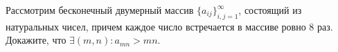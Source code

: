 \documentclass{article}
\begin{document}
Рассмотрим бесконечный двумерный массив $\{a_{ij}\}_{i,j=1}^{\infty}$, состоящий из натуральных чисел, причем каждое число встречается 
в массиве ровно $8$ раз. Докажите, что $\exists (m,n): a_{mn} > mn$.
\end{document}
